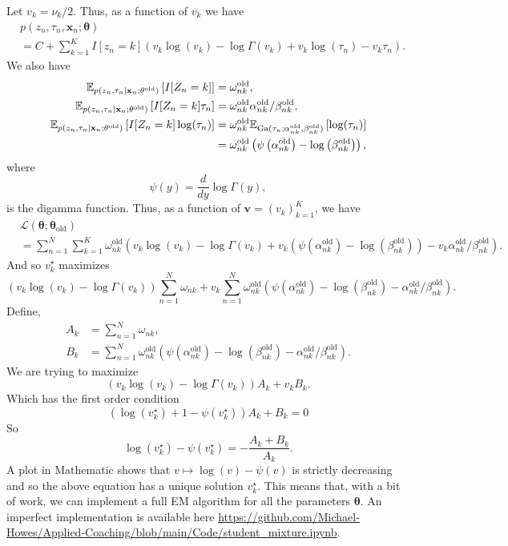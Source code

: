 Let $v_k = \nu_k/2$. Thus, as a function of $v_k$ we have
\begin{align*}
    & p(z_n,\tau_n,\mathbf{x}_n;\mathbf{\theta})\\
   &=C+\sum_{k=1}^KI[z_n = k]\left(v_k\log(v_k)-\log \Gamma(v_k) + v_k\log(\tau_n) -v_k\tau_n\right).
\end{align*}
We also have
\begin{align*}
    {\mathbb E}_{p(z_n,\tau_n\mid \mathbf{x}_n;\mathbf{\theta}^{\text{old}})}\left[I[Z_n=k]\right]&=\omega_{nk}^{\mathrm{old}},\\
    {\mathbb E}_{p(z_n,\tau_n\mid \mathbf{x}_n;\mathbf{\theta}^{\text{old}})}\left[I[Z_n=k]\tau_n\right]&=\omega_{nk}^{\mathrm{old}}\alpha_{nk}^{\text{old}}/\beta_{nk}^{\text{old}},\\
    {\mathbb E}_{p(z_n,\tau_n\mid \mathbf{x}_n;\mathbf{\theta}^{\text{old}})}\left[I[Z_n=k]\log(\tau_n)\right]&=\omega_{nk}^{\mathrm{old}}{\mathbb E}_{\mathrm{Ga}(\tau_n;\alpha_{nk}^{\text{old}},\beta_{nk}^{\text{old}})}\left[\log(\tau_n)\right]\\
    &=\omega_{nk}^{\mathrm{old}}\left(\psi\left(\alpha_{nk}^{\text{old}}\right) - \log\left(\beta_{nk}^{\text{old}}\right)\right),
\end{align*}
where
\[\psi(y)= \frac{d}{dy}\log \Gamma(y), \]
is the digamma function. Thus, as a function of $\mathbf{v}=(v_k)_{k=1}^K$, we have
\begin{align*}
    &\mathcal{L}(\mathbf{\theta};\mathbf{\theta}_{\text{old}})\\
    &=\sum_{n=1}^N \sum_{k=1}^K \omega_{nk}^{\text{old}}\left(v_k\log(v_k)-\log \Gamma(v_k)+v_k\left(\psi\left(\alpha_{nk}^{\text{old}}\right) - \log\left(\beta_{nk}^{\text{old}}\right)\right) -v_k\alpha_{nk}^{\text{old}}/\beta_{nk}^{\text{old}}\right).
\end{align*}
And so $v_k^\star$ maximizes
\[ \left(v_k\log(v_k)-\log \Gamma(v_k)\right)\sum_{n=1}^N\omega_{nk} +v_k \sum_{n=1}^N \omega_{nk}^{\text{old}}\left(\psi\left(\alpha_{nk}^{\text{old}}\right) - \log\left(\beta_{nk}^{\text{old}}\right)-\alpha_{nk}^{\text{old}}/\beta_{nk}^{\text{old}}\right).  \]
Define,
\begin{align*}
    A_k &= \sum_{n=1}^N\omega_{nk},\\
    B_k &= \sum_{n=1}^N \omega_{nk}^{\text{old}}\left(\psi\left(\alpha_{nk}^{\text{old}}\right) - \log\left(\beta_{nk}^{\text{old}}\right)-\alpha_{nk}^{\text{old}}/\beta_{nk}^{\text{old}}\right).
\end{align*}
We are trying to maximize
\[(v_k\log(v_k)-\log \Gamma(v_k))A_k + v_kB_k. \]
Which has the first order condition
\[\left(\log(v_k^\star)+1 -\psi(v_k^\star)\right)A_k + B_k = 0 \]
So
\[\log(v_k^\star) - \psi(v_k^\star) = -\frac{A_k+B_k}{A_k}. \]
A plot in Mathematic shows that $v \mapsto \log(v) - \psi(v)$ is strictly decreasing and so the above equation has a unique solution $v_k^\star$. This means that, with a bit of work, we can implement a full EM algorithm for all the parameters $\mathbf{\theta}$. An imperfect implementation is available here \url{https://github.com/Michael-Howes/Applied-Coaching/blob/main/Code/student_mixture.ipynb}.

